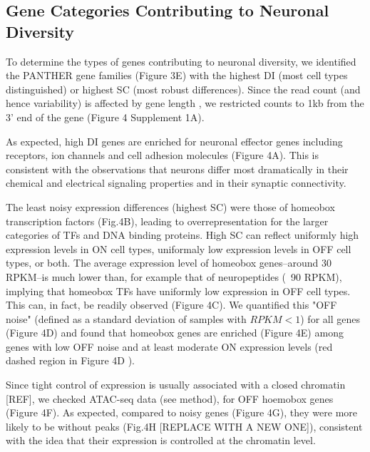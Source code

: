 \subsection{Gene Categories Contributing to Neuronal Diversity}

To determine the types of genes contributing to neuronal diversity, we identified the PANTHER gene families (Figure 3E) with the highest DI (most cell types distinguished) or highest SC (most robust differences). Since the read count (and hence variability) is affected by gene length \cite{Oshlack_2009}, we restricted counts to 1kb from the 3' end of the gene (Figure 4 Supplement 1A). 

As expected, high DI genes are enriched for neuronal effector genes including receptors, ion channels and cell adhesion molecules (Figure 4A). This is consistent with the observations that neurons differ most dramatically in their chemical and electrical signaling properties and in their synaptic connectivity.

The least noisy expression differences (highest SC) were those of homeobox transcription factors (Fig.4B), leading to overrepresentation for the larger categories of TFs and DNA binding proteins. High SC can reflect uniformly high expression levels in ON cell types, uniformaly low expression levels in OFF cell types, or both. The average expression level of homeobox genes--around 30 RPKM--is much lower than, for example that of  neuropeptides (~90 RPKM), implying that homeobox TFs have uniformly low expression in OFF cell types. This can, in fact, be readily observed (Figure 4C). We quantified this "OFF noise" (defined as a standard deviation of samples with $RPKM<1$) for all genes (Figure 4D) and found that homeobox genes are enriched (Figure 4E) among genes with low OFF noise and at least moderate ON expression levels (red dashed region in Figure 4D ).

Since tight control of expression is usually associated with a closed chromatin [REF], we checked ATAC-seq data (see method), for OFF hoemobox genes (Figure 4F). As expected, compared to noisy genes (Figure 4G), they were more likely to be without peaks (Fig.4H [REPLACE WITH A NEW ONE]), consistent with the idea that their expression is controlled at the chromatin level.

